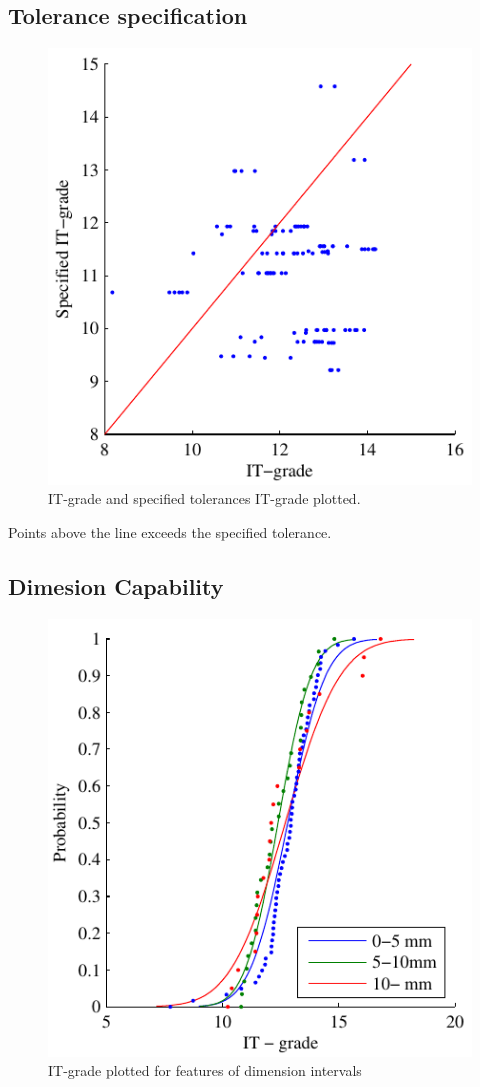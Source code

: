 \documentclass[aip,amsmath, reprint, author-year,nobalancelastpage]{revtex4-1}
\begin{document}
\subsection{Tolerance specification}
\begin{figure}[H]
\includegraphics{ITG_ITGSpec.pdf}
\caption{\label{fig:ITG_ITGSpec} IT-grade and specified tolerances IT-grade plotted.}
\end{figure}

Points above the line exceeds the specified tolerance. 

\newpage

\subsection{Dimesion Capability}
\begin{figure}[H]
\includegraphics{ITG_DimSort.pdf}
\caption{\label{fig:ITG_DimSort} IT-grade plotted for features of dimension intervals  }
\end{figure}
\end{document}
